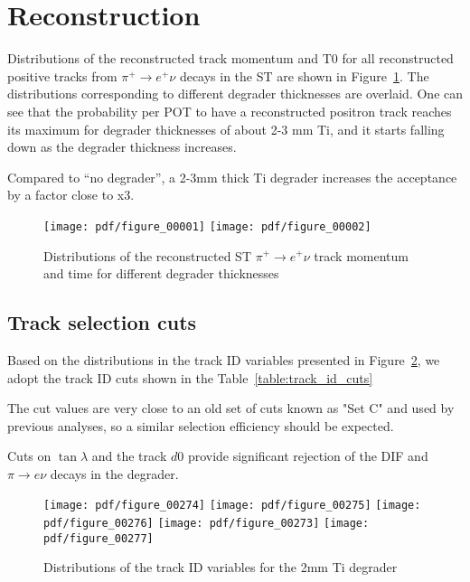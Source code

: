 \newpage
\section {Reconstruction }

Distributions of the reconstructed track momentum and T0 for all reconstructed positive
tracks from $\pi^+ \to e^+ \nu $ decays in the ST are shown in Figure~\ref{fig:all_tracks_p_t0}.
The distributions corresponding to different degrader thicknesses are overlaid.
One can see that the probability per POT to have a reconstructed positron track reaches its maximum
for degrader thicknesses of about 2-3 mm Ti, and it starts falling down as the degrader thickness
increases.

Compared to ``no degrader'', a 2-3mm thick Ti degrader increases the acceptance by a factor
close to x3.

\begin{figure}[H]
  \texttt{[image: pdf/figure\_00001]}
  \texttt{[image: pdf/figure\_00002]}
  \caption{
    \label{fig:all_tracks_p_t0}
    Distributions of the reconstructed ST $\pi^+ \to e^+ \nu$ track momentum and time
    for different degrader thicknesses
  }
\end{figure}

\subsection{Track selection cuts}

Based on the distributions in the track ID variables presented in Figure~\ref{fig:tid_variables_2mm},
we adopt the track ID cuts shown in the Table~\ref{table:track_id_cuts}

The cut values are very close to an old set of cuts known as "Set C" \cite{MU2E:3996:CutsetC}
and used by previous analyses, so a similar selection efficiency should be expected.

Cuts on $\tan \lambda$ and the track $d0$ provide significant rejection of the DIF
and $\pi \to e \nu$ decays in the degrader.

\begin{figure}[H]
  \texttt{[image: pdf/figure\_00274]}  %
  \texttt{[image: pdf/figure\_00275]}  %
  \texttt{[image: pdf/figure\_00276]}  %
  \texttt{[image: pdf/figure\_00273]}  %
  \texttt{[image: pdf/figure\_00277]}  %
  \caption{
    \label{fig:tid_variables_2mm}
    Distributions of the track ID variables for the 2mm Ti degrader
  }
\end{figure}

